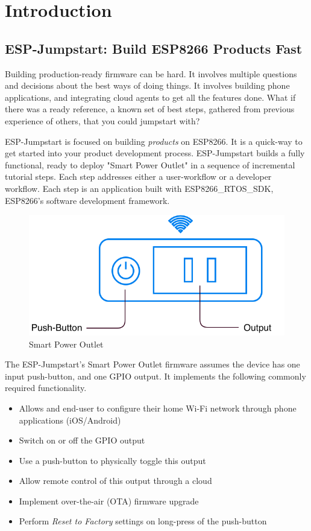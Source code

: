 \documentclass[main.tex]{subfiles}
\begin{document}
\chapter{Introduction}

\section{ESP-Jumpstart: Build ESP8266 Products Fast}

Building production-ready firmware can be hard. It involves multiple questions and decisions about the best ways of doing things. It involves building phone applications, and integrating cloud agents to get all the features done. What if there was a ready reference, a known set of best steps, gathered from previous experience of others, that you could jumpstart with?

ESP-Jumpstart is focused on building \textit{products} on ESP8266. It is a quick-way to get started into your product development process. ESP-Jumpstart builds a fully functional, ready to deploy "Smart Power Outlet" in a sequence of incremental tutorial steps. Each step addresses either a user-workflow or a developer workflow. Each step is an application built with ESP8266\_RTOS\_SDK, ESP8266's software development framework.

\begin{figure}[h!]
    \centering
    \includegraphics[scale=0.4]{../../_static/jumpstart-outlet.png}
    \caption{Smart Power Outlet}
    \label{fig:power_outlet}
\end{figure}

The ESP-Jumpstart's Smart Power Outlet firmware assumes the device has one input push-button, and one GPIO output. It implements the following commonly required functionality.

\begin{itemize}
  \item Allows and end-user to configure their home Wi-Fi network through phone applications (iOS/Android)
  \item Switch on or off the GPIO output
  \item Use a push-button to physically toggle this output
  \item Allow remote control of this output through a cloud
  \item Implement over-the-air (OTA) firmware upgrade
  \item Perform \textit{Reset to Factory} settings on long-press of the push-button
\end{itemize}
\end{document}
